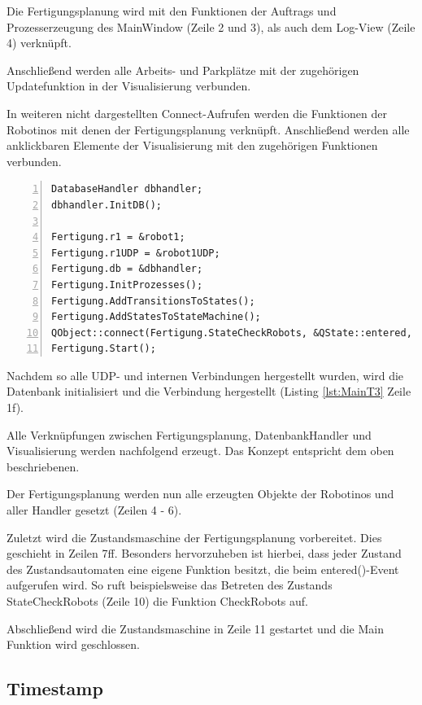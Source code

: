 Die Fertigungsplanung wird mit den Funktionen der Auftrags und Prozesserzeugung des MainWindow (Zeile 2 und 3), als auch dem Log-View (Zeile 4) verknüpft. 

Anschließend werden alle Arbeits- und Parkplätze mit der zugehörigen Updatefunktion in der Visualisierung verbunden.

In weiteren nicht dargestellten Connect-Aufrufen werden die Funktionen der Robotinos mit denen der Fertigungsplanung verknüpft. Anschließend werden alle anklickbaren Elemente der Visualisierung mit den zugehörigen Funktionen verbunden. 

\begin{lstlisting}[frame=single, breaklines=true, numbers=left, stepnumber=1, firstnumber=1, numberstyle = \tiny, caption=Main Funktion Teil 3 - Datenbank und StateMachine,label=lst:MainT3]
DatabaseHandler dbhandler;
dbhandler.InitDB();

Fertigung.r1 = &robot1;
Fertigung.r1UDP = &robot1UDP;
Fertigung.db = &dbhandler;
Fertigung.InitProzesses();
Fertigung.AddTransitionsToStates();
Fertigung.AddStatesToStateMachine();
QObject::connect(Fertigung.StateCheckRobots, &QState::entered, &Fertigung, &Fertigungsplanung::CheckRobots);
Fertigung.Start();
\end{lstlisting}

Nachdem so alle UDP- und internen Verbindungen hergestellt wurden, wird die Datenbank initialisiert und die Verbindung hergestellt (Listing \ref{lst:MainT3} Zeile 1f). 

Alle Verknüpfungen zwischen Fertigungsplanung, DatenbankHandler und Visualisierung werden nachfolgend erzeugt. Das Konzept entspricht dem oben beschriebenen. 

Der Fertigungsplanung werden nun alle erzeugten Objekte der Robotinos und aller Handler gesetzt (Zeilen 4 - 6). 

Zuletzt wird die Zustandsmaschine der Fertigungsplanung vorbereitet. Dies geschieht in Zeilen 7ff. Besonders hervorzuheben ist hierbei, dass jeder Zustand des Zustandsautomaten eine eigene Funktion besitzt, die beim entered()-Event aufgerufen wird. So ruft beispielsweise das Betreten des Zustands StateCheckRobots (Zeile 10) die Funktion CheckRobots auf. 

Abschließend wird die Zustandsmaschine in Zeile 11 gestartet und die Main Funktion wird geschlossen. 

\subsection{Timestamp}

